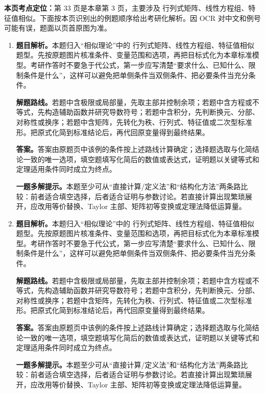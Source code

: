 \begin{solutionblock}
\textbf{本页考点定位：}第 33 页是本章第 3 页，主要涉及 行列式矩阵、线性方程组、特征值相似。下面按本页识别出的例题顺序给出考研化解析。因 OCR 对中文和例号可能有误，题面以页首原图为准。

\begin{enumerate}[label=\textbf{例\arabic*.}, leftmargin=2.4em]

\item \textbf{题目解析。}本题归入“相似理论”中的 行列式矩阵、线性方程组、特征值相似 题型。先按原题图片核准条件、变量范围和选项，再把目标式化为本章标准模型。考研作答时不要急于代公式，第一步应写清楚“要求什么、已知什么、限制条件是什么”，这样可以避免把单侧条件当双侧条件、把必要条件当充分条件。

\textbf{解题路线。}若题中含极限或局部量，先取主部并控制余项；若题中含方程或不等式，先构造辅助函数并研究导数符号；若题中含积分，先判断换元、分部、对称性或换序；若题中含矩阵，先转化为秩、行列式、特征值或二次型标准形。把原式化简到标准结论后，再代回原变量得到最终结果。

\textbf{答案。}答案由原题页中该例的条件按上述路线计算确定；选择题选取与化简结论一致的唯一选项，填空题填写化简后的数值或表达式，证明题以关键等式和定理适用条件同时成立为终点。

\textbf{一题多解提示。}本题至少可从“直接计算/定义法”和“结构化方法”两条路比较：前者适合填空选择，后者适合证明与参数讨论。若直接计算出现繁琐展开，应改用等价替换、Taylor 主部、矩阵初等变换或定理法降低运算量。

\item \textbf{题目解析。}本题归入“相似理论”中的 行列式矩阵、线性方程组、特征值相似 题型。先按原题图片核准条件、变量范围和选项，再把目标式化为本章标准模型。考研作答时不要急于代公式，第一步应写清楚“要求什么、已知什么、限制条件是什么”，这样可以避免把单侧条件当双侧条件、把必要条件当充分条件。

\textbf{解题路线。}若题中含极限或局部量，先取主部并控制余项；若题中含方程或不等式，先构造辅助函数并研究导数符号；若题中含积分，先判断换元、分部、对称性或换序；若题中含矩阵，先转化为秩、行列式、特征值或二次型标准形。把原式化简到标准结论后，再代回原变量得到最终结果。

\textbf{答案。}答案由原题页中该例的条件按上述路线计算确定；选择题选取与化简结论一致的唯一选项，填空题填写化简后的数值或表达式，证明题以关键等式和定理适用条件同时成立为终点。

\textbf{一题多解提示。}本题至少可从“直接计算/定义法”和“结构化方法”两条路比较：前者适合填空选择，后者适合证明与参数讨论。若直接计算出现繁琐展开，应改用等价替换、Taylor 主部、矩阵初等变换或定理法降低运算量。

\end{enumerate}
\end{solutionblock}



